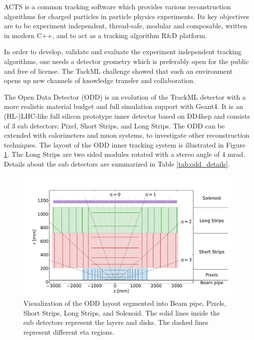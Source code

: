 \documentclass[10pt, paper=a4, UKenglish]{article}
\begin{document}
ACTS is a common tracking software which provides various reconstruction algorithms for charged particles in particle physics experiments\cite{acts}. Its key objectives are to be experiment independent, thread-safe, modular and composable, written in modern C++, and to act as a tracking algorithm R\&D platform.

In order to develop, validate and evaluate the experiment independent tracking algorithms, one needs a detector geometry which is preferably open for the public and free of license. The TackML challenge showed that such an environment opens up new channels of knowledge transfer and collaboration.

The Open Data Detector (ODD) is an evolution of the TrackML detector with a more realistic material budget and full simulation support with Geant4. It is an (HL-)LHC-like full silicon prototype inner detector based on DD4hep and consists of 3 sub detectors: Pixel, Short Strips, and Long Strips. The ODD can be extended with calorimeters\cite{odd_chep} and muon systems, to investigate other reconstruction techniques. The layout of the ODD inner tracking system is illustrated in Figure \ref{fig:odd_layout}. The Long Strips are two sided modules rotated with a stereo angle of 4 mrad. Details about the sub detectors are summarized in Table \ref{tab:odd_details}.

\begin{figure}[htb!]
  \centering
  \includegraphics[width=0.6\linewidth]{figures/detector_layout.pdf}
  \caption{Visualization of the ODD layout segmented into Beam pipe, Pixels, Short Strips, Long Strips, and Solenoid. The solid lines inside the sub detectors represent the layers and disks. The dashed lines represent different eta regions.}
  \label{fig:odd_layout}
\end{figure}
\end{document}
